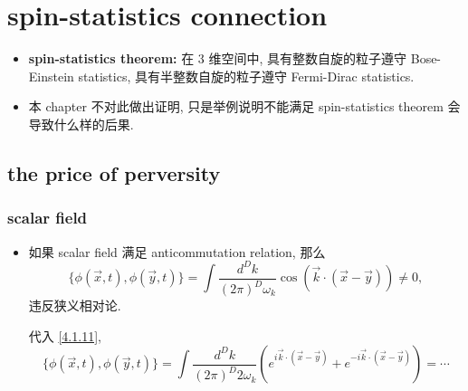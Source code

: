 \chapter{spin-statistics connection}
\begin{itemize}
	\item \textbf{spin-statistics theorem:} 在 3 维空间中, 具有整数自旋的粒子遵守 Bose-Einstein statistics, 具有半整数自旋的粒子遵守 Fermi-Dirac statistics.
	
	\item 本 chapter 不对此做出证明, 只是举例说明不能满足 spin-statistics theorem 会导致什么样的后果.
\end{itemize}

\section{the price of perversity}
\subsection{scalar field}
\begin{itemize}
	\item 如果 scalar field 满足 anticommutation relation, 那么
	\begin{equation}
		\{\phi(\vec{x}, t), \phi(\vec{y}, t)\} = \int \frac{d^D k}{(2 \pi)^D \omega_k} \cos(\vec{k} \cdot (\vec{x} - \vec{y})) \neq 0,
	\end{equation}
	违反狭义相对论.
	
	\begin{tcolorbox}[title=calculation:]
		代入 \eqref{4.1.11},
		\begin{equation}
			\{\phi(\vec{x}, t), \phi(\vec{y}, t)\} = \int \frac{d^D k}{(2 \pi)^D 2 \omega_k} (e^{i \vec{k} \cdot (\vec{x} - \vec{y})} + e^{- i \vec{k} \cdot (\vec{x} - \vec{y})}) = \cdots
		\end{equation}
	\end{tcolorbox}
\end{itemize}

